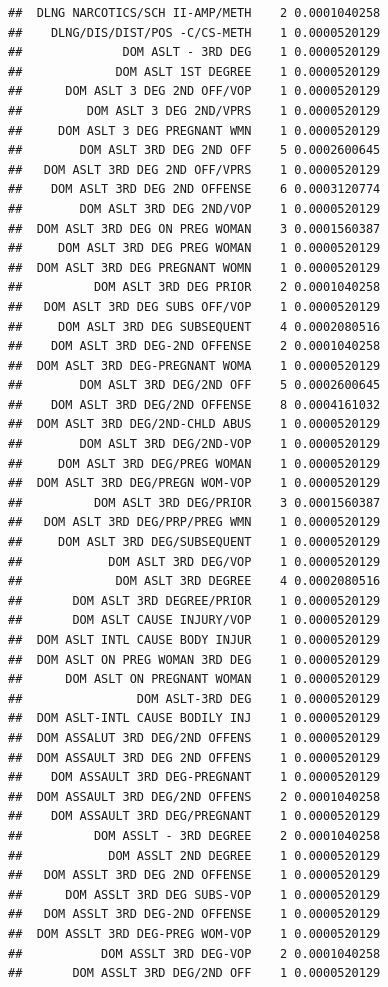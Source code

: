 \documentclass[]{book}
\begin{document}
\begin{verbatim}
##  DLNG NARCOTICS/SCH II-AMP/METH    2 0.0001040258
##    DLNG/DIS/DIST/POS -C/CS-METH    1 0.0000520129
##              DOM ASLT - 3RD DEG    1 0.0000520129
##             DOM ASLT 1ST DEGREE    1 0.0000520129
##      DOM ASLT 3 DEG 2ND OFF/VOP    1 0.0000520129
##         DOM ASLT 3 DEG 2ND/VPRS    1 0.0000520129
##     DOM ASLT 3 DEG PREGNANT WMN    1 0.0000520129
##        DOM ASLT 3RD DEG 2ND OFF    5 0.0002600645
##   DOM ASLT 3RD DEG 2ND OFF/VPRS    1 0.0000520129
##    DOM ASLT 3RD DEG 2ND OFFENSE    6 0.0003120774
##        DOM ASLT 3RD DEG 2ND/VOP    1 0.0000520129
##  DOM ASLT 3RD DEG ON PREG WOMAN    3 0.0001560387
##     DOM ASLT 3RD DEG PREG WOMAN    1 0.0000520129
##  DOM ASLT 3RD DEG PREGNANT WOMN    1 0.0000520129
##          DOM ASLT 3RD DEG PRIOR    2 0.0001040258
##   DOM ASLT 3RD DEG SUBS OFF/VOP    1 0.0000520129
##     DOM ASLT 3RD DEG SUBSEQUENT    4 0.0002080516
##    DOM ASLT 3RD DEG-2ND OFFENSE    2 0.0001040258
##  DOM ASLT 3RD DEG-PREGNANT WOMA    1 0.0000520129
##        DOM ASLT 3RD DEG/2ND OFF    5 0.0002600645
##    DOM ASLT 3RD DEG/2ND OFFENSE    8 0.0004161032
##  DOM ASLT 3RD DEG/2ND-CHLD ABUS    1 0.0000520129
##        DOM ASLT 3RD DEG/2ND-VOP    1 0.0000520129
##     DOM ASLT 3RD DEG/PREG WOMAN    1 0.0000520129
##  DOM ASLT 3RD DEG/PREGN WOM-VOP    1 0.0000520129
##          DOM ASLT 3RD DEG/PRIOR    3 0.0001560387
##   DOM ASLT 3RD DEG/PRP/PREG WMN    1 0.0000520129
##     DOM ASLT 3RD DEG/SUBSEQUENT    1 0.0000520129
##            DOM ASLT 3RD DEG/VOP    1 0.0000520129
##             DOM ASLT 3RD DEGREE    4 0.0002080516
##       DOM ASLT 3RD DEGREE/PRIOR    1 0.0000520129
##       DOM ASLT CAUSE INJURY/VOP    1 0.0000520129
##  DOM ASLT INTL CAUSE BODY INJUR    1 0.0000520129
##  DOM ASLT ON PREG WOMAN 3RD DEG    1 0.0000520129
##      DOM ASLT ON PREGNANT WOMAN    1 0.0000520129
##                DOM ASLT-3RD DEG    1 0.0000520129
##  DOM ASLT-INTL CAUSE BODILY INJ    1 0.0000520129
##  DOM ASSALUT 3RD DEG/2ND OFFENS    1 0.0000520129
##  DOM ASSAULT 3RD DEG 2ND OFFENS    1 0.0000520129
##    DOM ASSAULT 3RD DEG-PREGNANT    1 0.0000520129
##  DOM ASSAULT 3RD DEG/2ND OFFENS    2 0.0001040258
##    DOM ASSAULT 3RD DEG/PREGNANT    1 0.0000520129
##          DOM ASSLT - 3RD DEGREE    2 0.0001040258
##            DOM ASSLT 2ND DEGREE    1 0.0000520129
##   DOM ASSLT 3RD DEG 2ND OFFENSE    1 0.0000520129
##      DOM ASSLT 3RD DEG SUBS-VOP    1 0.0000520129
##   DOM ASSLT 3RD DEG-2ND OFFENSE    1 0.0000520129
##  DOM ASSLT 3RD DEG-PREG WOM-VOP    1 0.0000520129
##           DOM ASSLT 3RD DEG-VOP    2 0.0001040258
##       DOM ASSLT 3RD DEG/2ND OFF    1 0.0000520129

\end{verbatim}
\end{document}

